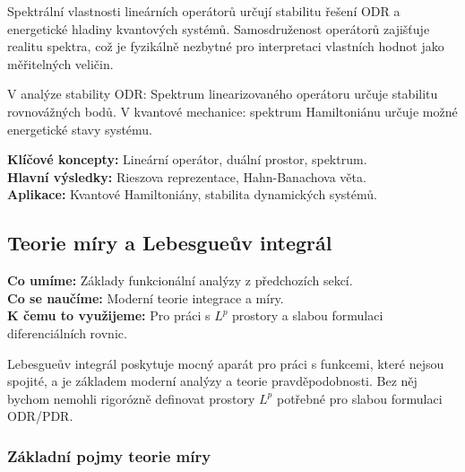 \begin{keyinsight}
Spektrální vlastnosti lineárních operátorů určují stabilitu řešení ODR a energetické hladiny kvantových systémů. Samosdruženost operátorů zajišťuje realitu spektra, což je fyzikálně nezbytné pro interpretaci vlastních hodnot jako měřitelných veličin.
\end{keyinsight}

\begin{application}
V analýze stability ODR: Spektrum linearizovaného operátoru určuje stabilitu rovnovážných bodů. V kvantové mechanice: spektrum Hamiltoniánu určuje možné energetické stavy systému.
\end{application}

\begin{summary}
\textbf{Klíčové koncepty:} Lineární operátor, duální prostor, spektrum. \\
\textbf{Hlavní výsledky:} Rieszova reprezentace, Hahn-Banachova věta. \\
\textbf{Aplikace:} Kvantové Hamiltoniány, stabilita dynamických systémů.
\end{summary}

\spc

\subsection{Teorie míry a Lebesgueův integrál}

\begin{scaffold}
\textbf{Co umíme:} Základy funkcionální analýzy z předchozích sekcí. \\
\textbf{Co se naučíme:} Moderní teorie integrace a míry. \\
\textbf{K čemu to využijeme:} Pro práci s $L^p$ prostory a slabou formulaci diferenciálních rovnic.
\end{scaffold}

\begin{motivation}
Lebesgueův integrál poskytuje mocný aparát pro práci s funkcemi, které nejsou spojité, a je základem moderní analýzy a teorie pravděpodobnosti. Bez něj bychom nemohli rigorózně definovat prostory $L^p$ potřebné pro slabou formulaci ODR/PDR.
\end{motivation}

\subsubsection{Základní pojmy teorie míry}

